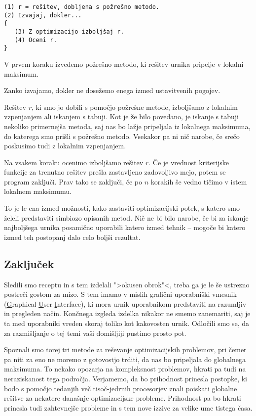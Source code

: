 \documentclass[10pt, a4paper]{article}
\begin{document}
\begin{verbatim}
(1) r = rešitev, dobljena s požrešno metodo.
(2) Izvajaj, dokler...
{
   (3) Z optimizacijo izboljšaj r.
   (4) Oceni r.
}
\end{verbatim}

   V prvem koraku izvedemo požrešno metodo, ki rešitev urnika pripelje v lokalni maksimum.

   Zanko izvajamo, dokler ne dosežemo enega izmed ustavitvenih pogojev.

   Rešitev $r$, ki smo jo dobili s pomočjo požrešne metode, izboljšamo z lokalnim vzpenjanjem
   ali iskanjem s tabuji. Kot je že bilo povedano, je iskanje s tabuji nekoliko primernejša metoda,
   saj nas bo lažje pripeljala iz lokalnega maksimuma, do katerega smo prišli s požrešno metodo.
   Vsekakor pa ni nič narobe, če srečo poskusimo tudi z lokalnim vzpenjanjem.

   Na vsakem koraku ocenimo izboljšamo rešitev $r$. Če je vrednost kriterijske funkcije
   za trenutno rešitev prešla zastavljeno zadovoljivo mejo, potem se program zaključi. Prav tako
   se zaključi, če po $n$ korakih še vedno tičimo v istem lokalnem maksimumu.

\noindent To je le ena izmed možnosti, kako zastaviti optimizacijski potek, s katero smo želeli predstaviti
simbiozo opisanih metod. Nič ne bi bilo narobe, če bi za iskanje najboljšega urnika posamično
uporabili katero izmed tehnik -- mogoče bi katero izmed teh postopanj dalo celo boljši rezultat.

\subsection{Zaključek}

Sledili smo receptu in s tem izdelali  ">okusen obrok"<, treba ga je le še ustrezno postreči
gostom za mizo. S tem imamo v mislih grafični uporabniški vmesnik (\underline{G}raphical
\underline{U}ser \underline{I}nterface), ki mora urnik uporabnikom predstaviti na razumljiv in
pregleden način. Končnega izgleda izdelka nikakor ne smemo zanemariti, saj je ta med uporabniki
vreden skoraj toliko kot kakovosten urnik. Odločili smo se, da za razmišljanje o tej temi vaši
domišljiji pustimo prosto pot.

Spoznali smo torej tri metode za reševanje optimizacijskih problemov, pri čemer pa niti za eno
ne moremo z gotovostjo trditi, da nas bo pripeljala do globalnega maksimuma. To nekako opozarja
na kompleksnost problemov, hkrati pa tudi na neraziskanost tega področja. Verjamemo, da bo
prihodnost prinesla postopke, ki bodo s pomočjo tedanjih več tisoč-jedrnih procesorjev znali
poiskati globalne rešitve za nekatere današnje optimizacijske probleme. Prihodnost pa bo
hkrati prinesla tudi zahtevnejše probleme in s tem nove izzive za velike ume tistega časa.
\end{document}
